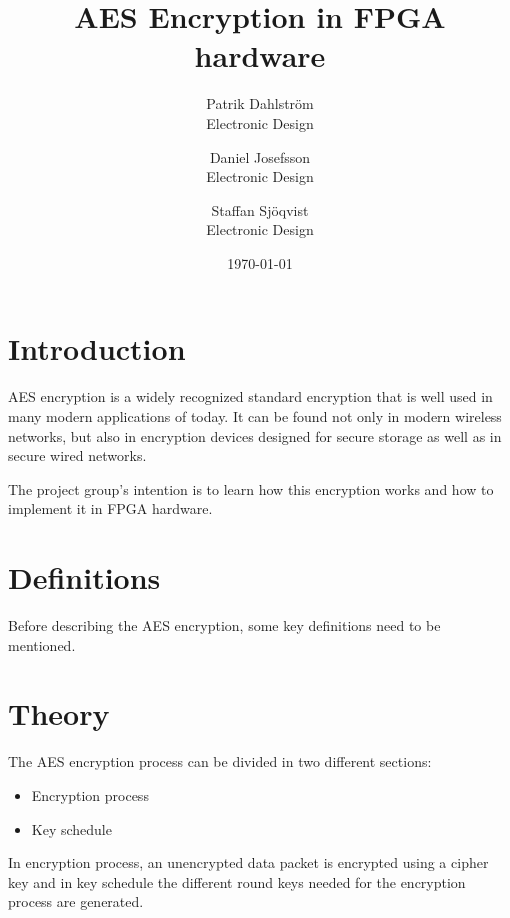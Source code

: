 \documentclass{report}
\title{AES Encryption in FPGA hardware}
\author{
        Patrik Dahlström \\
        Electronic Design\\
            \and
        Daniel Josefsson\\
        Electronic Design\\
            \and
        Staffan Sjöqvist\\
        Electronic Design
}}
\date{\today}
\begin{document}
\maketitle



\chapter{Introduction}
AES encryption is a widely recognized standard encryption that is well used in many modern applications of today. It can be found not only in modern wireless networks, but also in encryption devices designed for secure storage as well as in secure wired networks.

The project group's intention is to learn how this encryption works and how to implement it in FPGA hardware.

\chapter{Definitions}
Before describing the AES encryption, some key definitions need to be mentioned.



\chapter{Theory}
\label{sec:theory}
The AES encryption process can be divided in two different sections:
\begin{itemize}
\item Encryption process
\item Key schedule
\end{itemize}
In encryption process, an unencrypted data packet is encrypted using a cipher key and in key schedule the different round keys needed for the encryption process are generated.






\end{document}
